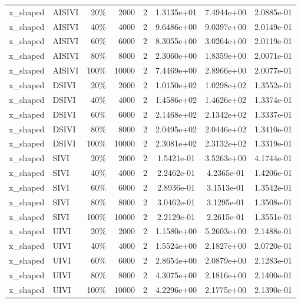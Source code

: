 \begin{tabular}{llrrrccc}
x\_shaped & AISIVI & 20\% & 2000 & 2 & 1.3135e+01 & 7.4944e+00 & 2.0885e-01 \\
x\_shaped & AISIVI & 40\% & 4000 & 2 & 9.6486e+00 & 9.0397e+00 & 2.0149e-01 \\
x\_shaped & AISIVI & 60\% & 6000 & 2 & 8.3055e+00 & 3.0264e+00 & 2.0119e-01 \\
x\_shaped & AISIVI & 80\% & 8000 & 2 & 2.3060e+00 & 1.8359e+00 & 2.0071e-01 \\
x\_shaped & AISIVI & 100\% & 10000 & 2 & 7.4469e+00 & 2.8966e+00 & 2.0077e-01 \\
x\_shaped & DSIVI & 20\% & 2000 & 2 & 1.0150e+02 & 1.0298e+02 & 1.3552e-01 \\
x\_shaped & DSIVI & 40\% & 4000 & 2 & 1.4586e+02 & 1.4626e+02 & 1.3374e-01 \\
x\_shaped & DSIVI & 60\% & 6000 & 2 & 2.1468e+02 & 2.1342e+02 & 1.3337e-01 \\
x\_shaped & DSIVI & 80\% & 8000 & 2 & 2.0495e+02 & 2.0446e+02 & 1.3410e-01 \\
x\_shaped & DSIVI & 100\% & 10000 & 2 & 2.3081e+02 & 2.3132e+02 & 1.3319e-01 \\
x\_shaped & SIVI & 20\% & 2000 & 2 & 1.5421e-01 & 3.5263e+00 & 4.1744e-01 \\
x\_shaped & SIVI & 40\% & 4000 & 2 & 2.2462e-01 & 4.2365e-01 & 1.4206e-01 \\
x\_shaped & SIVI & 60\% & 6000 & 2 & 2.8936e-01 & 3.1513e-01 & 1.3542e-01 \\
x\_shaped & SIVI & 80\% & 8000 & 2 & 3.0462e-01 & 3.1295e-01 & 1.3508e-01 \\
x\_shaped & SIVI & 100\% & 10000 & 2 & 2.2129e-01 & 2.2615e-01 & 1.3551e-01 \\
x\_shaped & UIVI & 20\% & 2000 & 2 & 1.1580e+00 & 5.2603e+00 & 2.1488e-01 \\
x\_shaped & UIVI & 40\% & 4000 & 2 & 1.5524e+00 & 2.1827e+00 & 2.0720e-01 \\
x\_shaped & UIVI & 60\% & 6000 & 2 & 2.8654e+00 & 2.0879e+00 & 2.1283e-01 \\
x\_shaped & UIVI & 80\% & 8000 & 2 & 4.3075e+00 & 2.1816e+00 & 2.1400e-01 \\
x\_shaped & UIVI & 100\% & 10000 & 2 & 4.2296e+00 & 2.1775e+00 & 2.1390e-01 \\
\bottomrule
\end{tabular}
